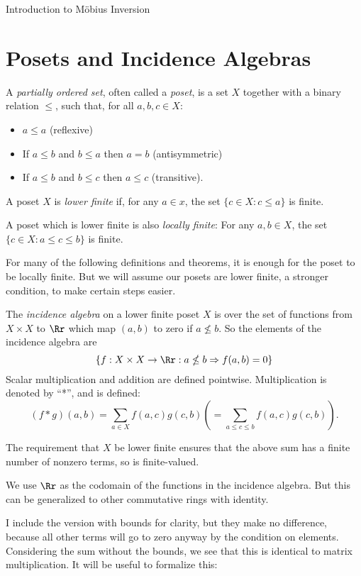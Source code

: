 \documentclass[12pt]{pom_thesis}
\begin{document}
\begin{chapter}{Introduction to M\"obius Inversion}
\section{Posets and Incidence Algebras}
\begin{defn}
A \emph{partially ordered set}, often called a \emph{poset}, is a set $X$ together with a binary relation $\leq$, such that, for all $a,b,c \in X$:
\begin{itemize}
\item $a \leq a$ (reflexive)
\item If $a \leq b$ and $b \leq a$ then $a = b$ (antisymmetric)
\item If $a \leq b$ and $b \leq c$ then $a \leq c$ (transitive).
\end{itemize}
\end{defn}
\begin{defn}
A poset $X$ is \emph{lower finite} if, for any $a \in x$, the set $\{ c \in X: c \leq a\}$ is finite.
\end{defn}
\begin{rmk}
A poset which is lower finite is also \emph{locally finite}: For any $a,b \in X$, the set $\{c \in X : a \leq c \leq b\}$ is finite.  
\end{rmk}
For many of the following definitions and theorems, it is enough for the poset to be locally finite. But we will assume our posets are lower finite, a stronger condition, to make certain steps easier.
\begin{defn}
The \emph{incidence algebra} on a lower finite poset $X$ is over the set of functions from $X \times X$ to $\Rr$ which map $(a,b)$ to zero if $a \nleq b$. So the elements of the incidence algebra are 
\[\{f:X \times X \rightarrow \Rr:a \nleq b \Rightarrow f(a,b) = 0\}
\]
Scalar multiplication and addition are defined pointwise.  Multiplication is denoted by ``*'', and is defined:
\[(f* g)(a,b) = \sum_{a \in X}f(a,c)g(c,b) \left( = \sum_{a \leq c \leq b}f(a,c)g(c,b)\right).\]
\end{defn}
\begin{rmk}
The requirement that $X$ be lower finite ensures that the above sum has a finite number of nonzero terms, so is finite-valued.
\end{rmk}
\begin{rmk}
We use $\Rr$ as the codomain of the functions in the incidence algebra. But this can be generalized to other commutative rings with identity.
\end{rmk}
I include the version with bounds for clarity, but they make no difference, because all other terms will go to zero anyway by the condition on elements. Considering the sum without the bounds, we see that this is identical to matrix multiplication. It will be useful to formalize this:

\end{chapter}
\end{document}
